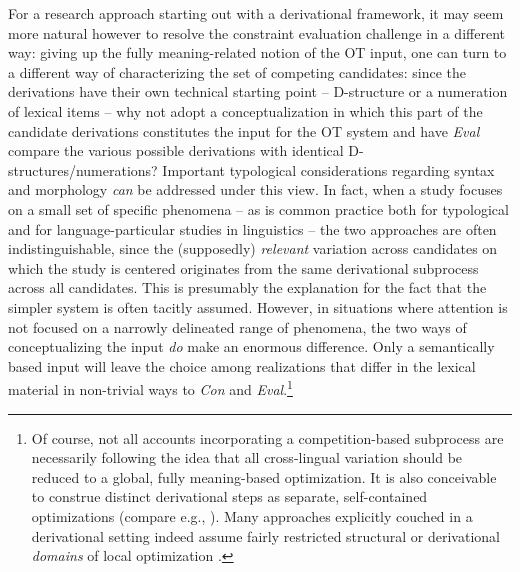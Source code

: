 \documentclass[output=paper,hidelinks]{langscibook}
\begin{document}
For a research approach starting out with a derivational framework, it may seem more natural however to resolve the constraint evaluation challenge in a different way: giving up the fully meaning-related notion of the OT input, one can turn to a different way of characterizing the set of competing candidates: since the derivations have their own technical starting point -- D-structure or a numeration of lexical items -- 
why not adopt a conceptualization in which this part of the candidate derivations constitutes 
the input for the OT system and have \emph{Eval} compare the various possible derivations with identical D-structures/nu\-mer\-a\-tions? Important typological considerations regarding syntax and morphology \emph{can} be addressed under this view.
In fact, when a study focuses on a small set of specific phenomena -- as is common practice both for typological and for language-particular studies in linguistics -- the two approaches are often indistinguishable, since the (supposedly) \emph{relevant} variation across candidates on which the study is centered originates from the same derivational subprocess across all candidates.
This is presumably the explanation for the fact that
the simpler system is often tacitly assumed. However, in situations where attention is not focused on a narrowly delineated range of phenomena, the two ways of conceptualizing the input \emph{do} make an enormous difference. Only a semantically based input will leave the choice among realizations that differ in the lexical material in non-trivial ways to \emph{Con} and \emph{Eval}.\footnote{Of course, not all accounts incorporating a competition-based subprocess are necessarily following the idea that all cross-lingual variation should be reduced to a global, fully meaning-based optimization. It is also conceivable to construe distinct derivational steps as separate, self-contained optimizations (compare e.g., \citealt{HeckMueller2000,Mueller2003}).  Many approaches explicitly couched in a derivational setting indeed assume fairly restricted structural or derivational \emph{domains} of local optimization \citep[sec.~4]{GMueller2012}.  %
}  %
\end{document}

